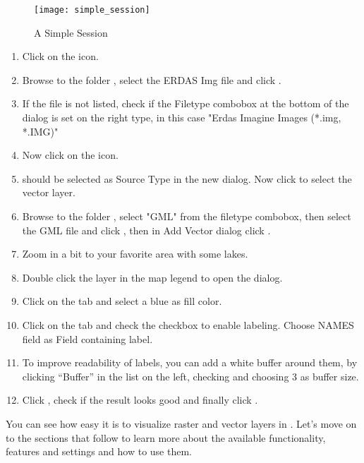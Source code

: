 \begin{figure}[ht]
   \centering 
   \texttt{[image: simple\_session]}
   \caption{A Simple \qg Session \nixcaption}\label{fig:simple_session}
\end{figure}


{\setlength{\baselineskip}{1.3\baselineskip}
\begin{enumerate}[itemsep=2pt]
\item Click on the  icon.
\item Browse to the folder , select 
the ERDAS Img file  and click .
\item If the file is not listed, check if the Filetype combobox at the
bottom of the dialog is set on the right type, in this case "Erdas Imagine
Images (*.img, *.IMG)"
\item Now click on the  icon. 
\item {} should be selected as Source Type in the new
 dialog. Now click  to select the
vector layer.
\item Browse to the folder , select "GML"
from the filetype combobox, then select the GML file  
and click , then in Add Vector dialog click .
\item Zoom in a bit to your favorite area with some lakes.
\item Double click the  layer in the map legend to open the 
 dialog.
\item Click on the  tab and select a blue as fill color.
\item Click on the  tab and check the  
checkbox to enable labeling. Choose NAMES field as Field containing label.
\item To improve readability of labels, you can add a white buffer around them,
by clicking ``Buffer'' in the list on the left, checking  and choosing 3 as buffer size.
\item Click , check if the result looks good and finally
click .
\end{enumerate} 
\par}
You can see how easy it is to visualize raster and vector layers in 
\qg. Let's move on to the sections that follow to learn more about the 
available functionality, features and settings and how to use them.

\FloatBarrier
